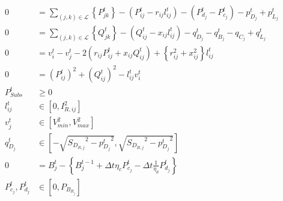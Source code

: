 \documentclass[../../outputs/main.tex]{subfiles}
\begin{document}
\begin{align}
    {0} &= {\sum_{(j, k) \in \mathcal{L}} \left\{P_{jk}^t\right\} - \left(P_{ij}^t - r_{ij}l_{ij}^t\right) - \left(P_{d_j}^t - P_{c_j}^t\right) - p^t_{D_j} + p^t_{L_j}} && \label{eq:RealPowerBalanceNodej} \\ 
    {0} &= {\sum_{(j, k) \in \mathcal{L}} \left\{Q_{jk}^t\right\} - \left(Q_{ij}^t - x_{ij}l_{ij}^t\right) - q_{D_j}^t - q_{B_j}^t - q_{C_j} + q^t_{L_j}} && \label{eq:ReactivePowerBalanceNodej} \\ 
    {0} &= {v_{i}^t - v_j^t - 2(r_{ij}P_{ij}^t + x_{ij}Q_{ij}^t) + \left\{r_{ij}^2 + x_{ij}^2\right\}l_{ij}^t} \label{eq:KVL-branch-ij} && \\
    {0} &= {(P_{ij}^{t})^2 + (Q_{ij}^{t})^2 - l_{ij}^t v_i^t} \label{eq:ApparentPowerEquationBFM} && \\
    {P^t_{Subs}} &\geq {0} \label{eq:substationRealPowerLimits} \\
    { l^{t}_{ij} } &\in { \left[ 0, I^{2}_{R, ij}
    \right] } \label{eq:lim_lij} && \\
    { v^{t}_{j} } &\in { \left[ V^{2}_{min}, V^{2}_{max} \right]} \label{eq:lim_vj} && \\
    { q^{t}_{D_{j}} } 
    &\in
    { \left[-\sqrt{ {S_{D_{R, j}}}^2 - {p^{t}_{D_{j}}}^2}, \sqrt{ {S_{D_{R, j}}}^2 - {p^{t}_{D_{j}}}^2}\right] } \label{eq:qDj} && \\
    {0} &= {  B_{j}^{t} - \left\{B_{j}^{t-1} + \Delta t  \eta_c P_{c_j}^t - \Delta t\frac{1}{\eta_d} P_{d_j}^t \right\} } \label{eq:SOC-j} &&  \\
    { P^{t}_{c_{j}}, P^{t}_{d_{j}} }
    &\in
    { \left[ 0, P_{B_{R_{j}}} \right]} \label{eq:lim_PcPdj} && \\

\end{align}
\end{document}
